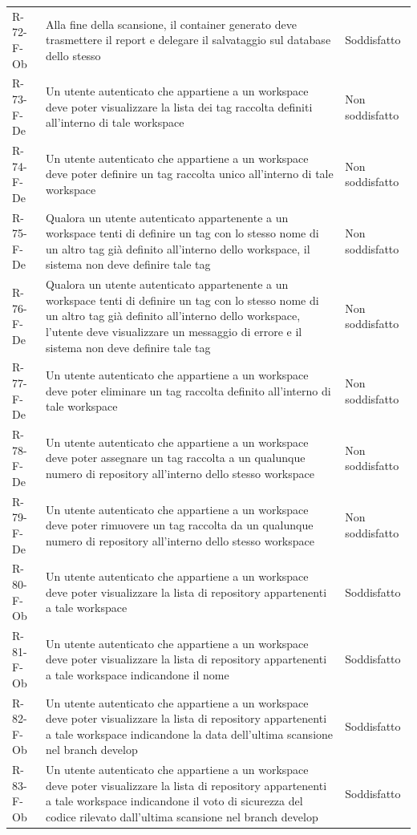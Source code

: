 \documentclass[a4paper, 11pt]{article}
\begin{document}
\begin{longtable}[c]{ >{\centering\arraybackslash}m{2.5cm} >{\centering\arraybackslash}m{8.3cm} >{\centering\arraybackslash}m{3.5cm} }
R-72-F-Ob & Alla fine della scansione, il container generato deve trasmettere il report e delegare il salvataggio sul database dello stesso & Soddisfatto\\
R-73-F-De & Un utente autenticato che appartiene a un workspace deve poter visualizzare la lista dei tag raccolta definiti all'interno di tale workspace & Non soddisfatto\\
R-74-F-De & Un utente autenticato che appartiene a un workspace deve poter definire un tag raccolta unico all'interno di tale workspace & Non soddisfatto\\
R-75-F-De & Qualora un utente autenticato appartenente a un workspace tenti di definire un tag con lo stesso nome di un altro tag già definito all'interno dello workspace, il sistema non deve definire tale tag & Non soddisfatto\\
R-76-F-De & Qualora un utente autenticato appartenente a un workspace tenti di definire un tag con lo stesso nome di un altro tag già definito all'interno dello workspace, l'utente deve visualizzare un messaggio di errore e il sistema non deve definire tale tag & Non soddisfatto\\
R-77-F-De & Un utente autenticato che appartiene a un workspace deve poter eliminare un tag raccolta definito all'interno di tale workspace & Non soddisfatto\\
R-78-F-De & Un utente autenticato che appartiene a un workspace deve poter assegnare un tag raccolta a un qualunque numero di repository all'interno dello stesso workspace & Non soddisfatto\\
R-79-F-De & Un utente autenticato che appartiene a un workspace deve poter rimuovere un tag raccolta da un qualunque numero di repository all'interno dello stesso workspace & Non soddisfatto\\
R-80-F-Ob & Un utente autenticato che appartiene a un workspace deve poter visualizzare la lista di repository appartenenti a tale workspace & Soddisfatto\\
R-81-F-Ob & Un utente autenticato che appartiene a un workspace deve poter visualizzare la lista di repository appartenenti a tale workspace indicandone il nome & Soddisfatto\\
R-82-F-Ob & Un utente autenticato che appartiene a un workspace deve poter visualizzare la lista di repository appartenenti a tale workspace indicandone la data dell'ultima scansione nel branch develop & Soddisfatto\\
R-83-F-Ob & Un utente autenticato che appartiene a un workspace deve poter visualizzare la lista di repository appartenenti a tale workspace indicandone il voto di sicurezza del codice rilevato dall'ultima scansione nel branch develop & Soddisfatto\\

\end{longtable}
\end{document}
